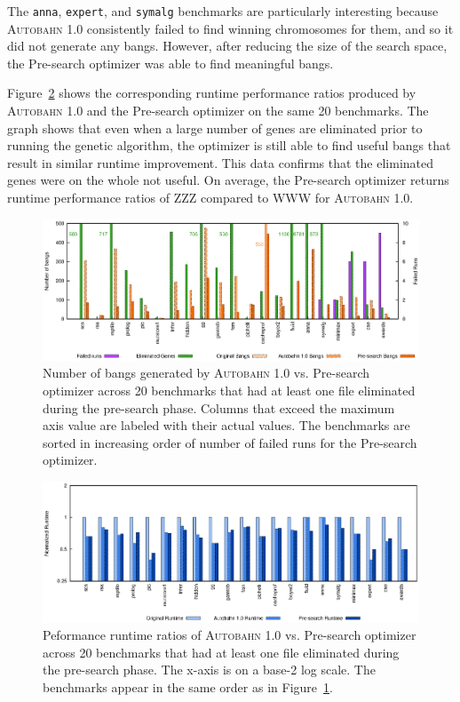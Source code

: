 \documentclass[format=sigplan, review=true]{acmart}
\newcommand{\figref}[1]{Figure~\ref{#1}}
\newcommand{\useful}[0]{useful}
\newcommand{\Ao}[0]{\textsc{Autobahn 1.0}}
\newcommand{\preopt}[0]{pre-search}
\newcommand{\Preopt}[0]{Pre-search}
\newcommand{\preoptPerformance}[0]{ZZZ}
\newcommand{\AoPerformance}[0]{WWW}
\begin{document}
The \texttt{anna}, \texttt{expert}, and \texttt{symalg} benchmarks are
particularly interesting because \Ao{} consistently failed to find
winning chromosomes for them, and so it did not generate any bangs. However,
after reducing the size of the search space, the \Preopt{}
optimizer was able to find meaningful bangs.

\figref{fig:preopt-runtime} shows the corresponding runtime
performance ratios produced by \Ao{} and the \Preopt{} optimizer on
the same 20 benchmarks.
The graph shows that even when a large number of genes are
eliminated prior to running the genetic algorithm, the optimizer is still able to
find \useful{} bangs that result in similar runtime improvement. This data
confirms that the eliminated genes were on the whole not \useful{}.
On average, the \Preopt{} optimizer returns runtime performance ratios
of \preoptPerformance{} compared to \AoPerformance{} for \Ao.

\begin{figure}
\includegraphics[width=\textwidth]{pre-aut-bangs}
\caption{Number of bangs generated by \Ao{} vs. \Preopt{} optimizer across 20 benchmarks that had at least
one file eliminated during the \preopt{} phase. Columns that exceed
the maximum axis value are labeled with their actual values. The
benchmarks are sorted in increasing order of number of failed runs for
the \Preopt{} optimizer.}
\label{fig:preopt-bangs}
\end{figure}

\begin{figure}
\includegraphics[width=\textwidth]{pre-aut}
\caption{Peformance runtime ratios of \Ao{} vs. \Preopt{} optimizer
across 20 benchmarks that had at least one
file eliminated during the \preopt{} phase. The x-axis 
is on a base-2 log scale. The benchmarks appear in the same order as
in \figref{fig:preopt-bangs}.}
\label{fig:preopt-runtime}
\end{figure}
\end{document}
